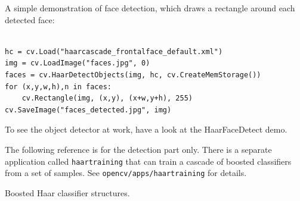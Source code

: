 \ifPython
A simple demonstration of face detection, which draws a rectangle around each detected face:

\begin{lstlisting}

hc = cv.Load("haarcascade_frontalface_default.xml")
img = cv.LoadImage("faces.jpg", 0)
faces = cv.HaarDetectObjects(img, hc, cv.CreateMemStorage())
for (x,y,w,h),n in faces:
    cv.Rectangle(img, (x,y), (x+w,y+h), 255)
cv.SaveImage("faces_detected.jpg", img)

\end{lstlisting}

\fi

\ifC
To see the object detector at work, have a look at the HaarFaceDetect demo.

The following reference is for the detection part only. There
is a separate application called \texttt{haartraining} that can
train a cascade of boosted classifiers from a set of samples. See
\texttt{opencv/apps/haartraining} for details.

\label{CvHaarFeature}
\label{CvHaarClassifier}
\label{CvHaarStageClassifier}
\label{CvHaarClassifierCascade}

Boosted Haar classifier structures.


